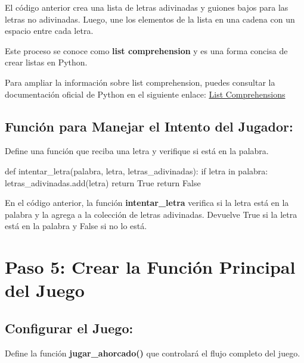 \documentclass[
  a4paper,
  DIV=11,
  numbers=noendperiod,
  onepage,
  openany]{scrreprt}
\newenvironment{Shaded}{\begin{snugshade}}{\end{snugshade}}
\newcommand{\ControlFlowTok}[1]{\textcolor[rgb]{0.00,0.23,0.31}{#1}}
\newcommand{\KeywordTok}[1]{\textcolor[rgb]{0.00,0.23,0.31}{#1}}
\newcommand{\NormalTok}[1]{\textcolor[rgb]{0.00,0.23,0.31}{#1}}
\newcommand{\VariableTok}[1]{\textcolor[rgb]{0.07,0.07,0.07}{#1}}
\begin{document}
El código anterior crea una lista de letras adivinadas y guiones bajos
para las letras no adivinadas. Luego, une los elementos de la lista en
una cadena con un espacio entre cada letra.

Este proceso se conoce como \textbf{list comprehension} y es una forma
concisa de crear listas en Python.

Para ampliar la información sobre list comprehension, puedes consultar
la documentación oficial de Python en el siguiente enlace:
\href{https://docs.python.org/3/tutorial/datastructures.html\#list-comprehensions}{List
Comprehensions}

\subsection{Función para Manejar el Intento del
Jugador:}\label{funciuxf3n-para-manejar-el-intento-del-jugador}

Define una función que reciba una letra y verifique si está en la
palabra.

\begin{Shaded}
\begin{Highlighting}[]
\KeywordTok{def}\NormalTok{ intentar\_letra(palabra, letra, letras\_adivinadas):}
    \ControlFlowTok{if}\NormalTok{ letra }\KeywordTok{in}\NormalTok{ palabra:}
\NormalTok{        letras\_adivinadas.add(letra)}
        \ControlFlowTok{return} \VariableTok{True}
    \ControlFlowTok{return} \VariableTok{False}
\end{Highlighting}
\end{Shaded}

En el código anterior, la función \textbf{intentar\_letra} verifica si
la letra está en la palabra y la agrega a la colección de letras
adivinadas. Devuelve True si la letra está en la palabra y False si no
lo está.

\section{Paso 5: Crear la Función Principal del
Juego}\label{paso-5-crear-la-funciuxf3n-principal-del-juego}

\subsection{Configurar el Juego:}\label{configurar-el-juego}

Define la función \textbf{jugar\_ahorcado()} que controlará el flujo
completo del juego.
\end{document}
